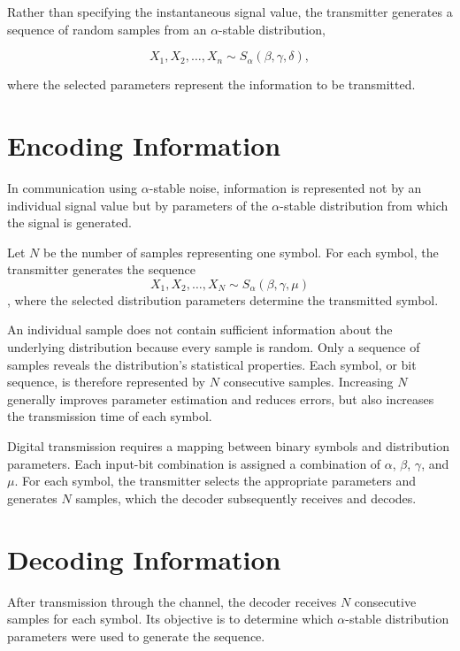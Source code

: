 \documentclass[a4paper, 12pt, openany]{book}
\begin{document}
Rather than specifying the instantaneous signal value, the transmitter generates a sequence of random samples from an $\alpha$-stable distribution,

\[
X_1,X_2,\ldots,X_n
\sim
S_\alpha(\beta,\gamma,\delta),
\]

where the selected parameters represent the information to be transmitted.

\section{Encoding Information}

In communication using $\alpha$-stable noise, information is represented not by an individual signal value but by parameters of the $\alpha$-stable distribution from which the signal is generated.

\begin{tcolorbox}[colback=blue!5!white,colframe=blue!50!black, title=Definition 7: Theoretical operation of the transmitter]
Let $N$ be the number of samples representing one symbol. For each symbol, the transmitter generates the sequence
\[
X_1,X_2,\dots,X_N
\sim
S_\alpha(\beta, \gamma,\mu)
\],
where the selected distribution parameters determine the transmitted symbol.
\end{tcolorbox}

An individual sample does not contain sufficient information about the underlying distribution because every sample is random. Only a sequence of samples reveals the distribution's statistical properties. Each symbol, or bit sequence, is therefore represented by $N$ consecutive samples. Increasing $N$ generally improves parameter estimation and reduces errors, but also increases the transmission time of each symbol.

Digital transmission requires a mapping between binary symbols and distribution parameters. Each input-bit combination is assigned a combination of $\alpha$, $\beta$, $\gamma$, and $\mu$. For each symbol, the transmitter selects the appropriate parameters and generates $N$ samples, which the decoder subsequently receives and decodes.

\section{Decoding Information}

After transmission through the channel, the decoder receives $N$ consecutive samples for each symbol. Its objective is to determine which $\alpha$-stable distribution parameters were used to generate the sequence.
\end{document}
